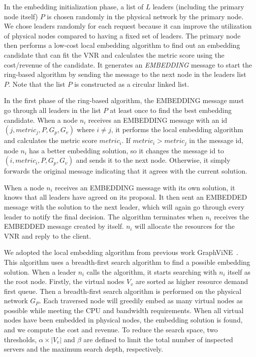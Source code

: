 In the embedding initialization phase, a list of $L$ leaders (including the primary node itself) $P$ is chosen randomly in the physical network by the primary node. We chose leaders randomly for each request because it can improve the utilization of physical nodes compared to having a fixed set of leaders. The primary node then performs a low-cost local embedding algorithm to find out an embedding candidate that can fit the VNR and calculates the metric score using the cost/revenue of the candidate. It generates an \textit{EMBEDDING} message to start the ring-based algorithm by sending the message to the next node in the leaders list $P$. Note that the list $P$ is constructed as a circular linked list.

In the first phase of the ring-based algorithm, the EMBEDDING message must go through all leaders in the list $P$ at least once to find the best embedding candidate. When a node $n_i$ receives an EMBEDDING message with an id $(j, metric_j, P, G_p, G_v)$ where $i \neq j$, it performs the local embedding algorithm and calculates the metric score $metric_i$. If $metric_i > metric_j$ in the message id, node $n_i$ has a better embedding solution, so it changes the message id to $(i, metric_i, P, G_p, G_v)$ and sends it to the next node. Otherwise, it simply forwards the original message indicating that it agrees with the current solution.

When a node $n_i$ receives an EMBEDDING message with its own solution, it knows that all leaders have agreed on its proposal. It then sent an EMBEDDED message with the solution to the next leader, which will again go through every leader to notify the final decision. The algorithm terminates when $n_i$ receives the EMBEDDED message created by itself. $n_i$ will allocate the resources for the VNR and reply to the client.

 We adopted the local embedding algorithm from previous work GraphViNE~\cite{habibi2020graphvine}. This algorithm uses a breadth-first search algorithm to find a possible embedding solution.
When a leader $n_i$ calls the algorithm, it starts searching with $n_i$ itself as the root node. Firstly, the virtual nodes $V_{v}$ are sorted as higher resource demand first queue. Then a breadth-first search algorithm is performed on the physical network $G_{P}$. Each traversed node will greedily embed as many virtual nodes as possible while meeting the CPU and bandwidth requirements. When all virtual nodes have been embedded in physical nodes, the embedding solution is found, and we compute the cost and revenue. To reduce the search space, two thresholds, $\alpha\times|V_v|$ and $\beta$ are defined to limit the total number of inspected servers and the maximum search depth, respectively. 

